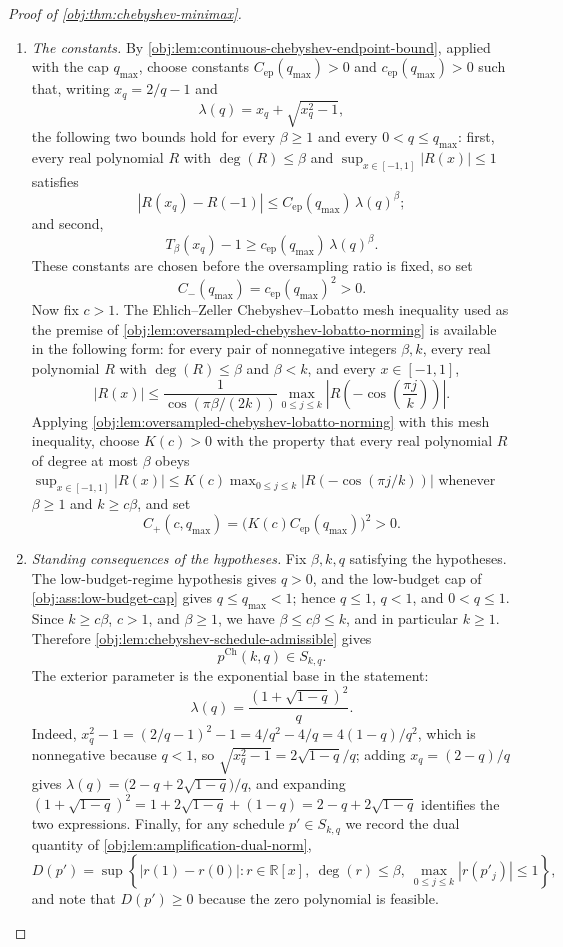 \begin{proof}[Proof of \cref{obj:thm:chebyshev-minimax}]
\begin{enumerate}
\item \emph{The constants.}
By \cref{obj:lem:continuous-chebyshev-endpoint-bound}, applied with the cap \(q_{\max}\), choose constants
\(C_{\mathrm{ep}}(q_{\max})>0\) and \(c_{\mathrm{ep}}(q_{\max})>0\) such that, writing
\(x_q=2/q-1\) and
\[
\lambda(q)=x_q+\sqrt{x_q^2-1},
\]
the following two bounds hold for every \(\beta\ge1\) and every \(0<q\le q_{\max}\): first, every real polynomial \(R\) with \(\deg(R)\le\beta\) and \(\sup_{x\in[-1,1]}|R(x)|\le1\) satisfies
\[
|R(x_q)-R(-1)|\le C_{\mathrm{ep}}(q_{\max})\,\lambda(q)^\beta ;
\]
and second,
\[
T_\beta(x_q)-1\ge c_{\mathrm{ep}}(q_{\max})\,\lambda(q)^\beta .
\]
These constants are chosen before the oversampling ratio is fixed, so set
\[
C_-(q_{\max})=c_{\mathrm{ep}}(q_{\max})^2>0.
\]
Now fix \(c>1\). The Ehlich--Zeller Chebyshev--Lobatto mesh inequality used as the premise of \cref{obj:lem:oversampled-chebyshev-lobatto-norming} is available in the following form: for every pair of nonnegative integers \(\beta,k\), every real polynomial \(R\) with \(\deg(R)\le\beta\) and \(\beta<k\), and every \(x\in[-1,1]\),
\[
 |R(x)|
 \le
 \frac{1}{\cos(\pi\beta/(2k))}
 \max_{0\le j\le k}\left|R\!\left(-\cos\!\left(\frac{\pi j}{k}\right)\right)\right|.
\]
Applying \cref{obj:lem:oversampled-chebyshev-lobatto-norming} with this mesh inequality, choose
\(K(c)>0\) with the property that every real polynomial \(R\) of degree at most \(\beta\) obeys
\(\sup_{x\in[-1,1]}|R(x)|\le K(c)\max_{0\le j\le k}\left|R(-\cos(\pi j/k))\right|\) whenever \(\beta\ge1\) and \(k\ge c\beta\), and set
\[
C_+(c,q_{\max})=\bigl(K(c)C_{\mathrm{ep}}(q_{\max})\bigr)^2>0 .
\]

\item \emph{Standing consequences of the hypotheses.}
Fix \(\beta,k,q\) satisfying the hypotheses. The low-budget-regime hypothesis gives \(q>0\), and the low-budget cap of \cref{obj:ass:low-budget-cap} gives
\(q\le q_{\max}<1\); hence \(q\le 1\), \(q<1\), and \(0<q\le 1\). Since \(k\ge c\beta\), \(c>1\), and
\(\beta\ge1\), we have \(\beta\le c\beta\le k\), and in particular \(k\ge1\). Therefore
\cref{obj:lem:chebyshev-schedule-admissible} gives
\[
p^{\mathrm{Ch}}(k,q)\in S_{k,q}.
\]
The exterior parameter is the exponential base in the statement:
\[
\lambda(q)=\frac{(1+\sqrt{1-q})^2}{q}.
\]
Indeed, \(x_q^2-1=(2/q-1)^2-1=4/q^2-4/q=4(1-q)/q^2\), which is nonnegative because \(q<1\), so \(\sqrt{x_q^2-1}=2\sqrt{1-q}/q\); adding \(x_q=(2-q)/q\) gives \(\lambda(q)=\bigl(2-q+2\sqrt{1-q}\bigr)/q\), and expanding \((1+\sqrt{1-q})^2=1+2\sqrt{1-q}+(1-q)=2-q+2\sqrt{1-q}\) identifies the two expressions.
Finally, for any schedule \(p'\in S_{k,q}\) we record the dual quantity of \cref{obj:lem:amplification-dual-norm},
\[
D(p')=\sup\left\{|r(1)-r(0)|:
r\in\mathbb R[x],\ \deg(r)\le\beta,\ \max_{0\le j\le k}|r(p'_j)|\le1\right\},
\]
and note that \(D(p')\ge0\) because the zero polynomial is feasible.


\end{enumerate}
\end{proof}
